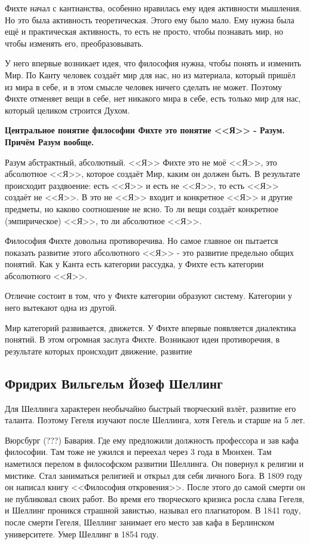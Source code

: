 Фихте начал с кантианства, особенно нравилась ему идея активности мышления. Но это была активность теоретическая. Этого ему было мало. Ему нужна была ещё и практическая активность, то есть не просто, чтобы познавать мир, но чтобы изменять его, преобразовывать.

    У него впервые возникает идея, что философия нужна, чтобы понять и изменить Мир. По Канту человек создаёт мир для нас, но из материала, который пришёл из мира в себе, и в этом смысле человек ничего сделать не может. Поэтому Фихте отменяет вещи в себе, нет никакого мира в себе, есть только мир для нас, который целиком строится Духом.

    \textbf{Центральное понятие философии Фихте это понятие <<Я>> - Разум. Причём Разум вообще.}

Разум абстрактный, абсолютный. <<Я>> Фихте это не моё <<Я>>, это абсолютное <<Я>>, которое создаёт Мир, каким он должен быть. В результате происходит раздвоение: есть <<Я>> и есть не <<Я>>, то есть <<Я>> создаёт не <<Я>>. В это не <<Я>> входит и конкретное <<Я>> и другие предметы, но каково соотношение не ясно. То ли вещи создаёт конкретное (эмпирическое) <<Я>>, то ли абсолютное <<Я>>.

    Философия Фихте довольна противоречива. Но самое главное он пытается показать развитие этого абсолютного <<Я>> - это развитие предельно общих понятий. Как у Канта есть категории рассудка, у Фихте есть категории абсолютного <<Я>>.

Отличие состоит в том, что у Фихте категории образуют систему. Категории у него вытекают одна из другой.

    Мир категорий развивается, движется. У Фихте впервые появляется диалектика понятий. В этом огромная заслуга Фихте. Возникают идеи противоречия, в результате которых происходит движение, развитие

\subsection{Фридрих Вильгельм Йозеф Шеллинг}

Для Шеллинга характерен необычайно быстрый творческий взлёт, развитие его таланта. Поэтому Гегеля изучают после Шеллинга, хотя Гегель и старше на 5 лет.

Вюрсбург (???) Бавария. Где ему предложили должность профессора и зав кафа философии. Там тоже не ужился и переехал через 3 года в Мюнхен. Там наметился перелом в философском развитии Шеллинга. Он повернул к религии и мистике. Стал заниматься религией и открыл для себя личного Бога. В 1809 году он написал книгу <<Философия откровения>>. После этого до самой смерти он не публиковал своих работ. Во время его творческого кризиса росла слава Гегеля, и Шеллинг проникся страшной завистью, называл его плагиатором. В 1841 году, после смерти Гегеля, Шеллинг занимает его место зав кафа в Берлинском университете. Умер Шеллинг в 1854 году.

